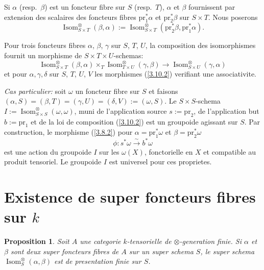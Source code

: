 \documentclass[11pt,a4paper]{article}
\theoremstyle{plain}
\newtheorem{proposition}[theorem]{Proposition}
\theoremstyle{definition}
\newcommand{\pr}{\mathrm{pr}}
\newcommand{\Isom}{\operatorname{Isom}}
\begin{document}
Si $\alpha$ (resp.~$\beta$) est un foncteur fibre sur $S$ (resp.~$T$), $\alpha$ et $\beta$ fournissent par extension des scalaires des foncteurs fibres $\pr_1^*\alpha$ et $\pr_2^*\beta$ sur $S\times T$. Nous poserons
\begin{equation}\label{3.10.1}
\Isom^\otimes_{S\times T}(\beta,\alpha):=\Isom^\otimes_{S\times T}(\pr_2^*\beta,\pr_1^*\alpha).
\end{equation}

Pour trois foncteurs fibres $\alpha$, $\beta$, $\gamma$ sur $S$, $T$, $U$, la composition des isomorphismes fournit un morphisme de $S\times T\times U$-schemas:
\begin{equation}\label{3.10.2}
\Isom^\otimes_{S\times T}(\beta,\alpha)\times_T\Isom^\otimes_{T\times U}(\gamma,\beta)\longrightarrow\Isom^\otimes_{S\times U}(\gamma,\alpha)
\end{equation}
et pour $\alpha,\gamma,\delta$ sur $S$, $T$, $U$, $V$ les morphismes (\ref{3.10.2}) verifiant une associativite.

\emph{Cas particulier:} soit $\omega$ un foncteur fibre sur $S$ et faisons $(\alpha,S)=(\beta,T)=(\gamma,U)=(\delta,V):=(\omega,S)$. Le $S\times S$-schema $I:=\Isom^\otimes_{S\times S}(\omega,\omega)$, muni de l'application source $s:=\pr_2$, de l'application but $b:=\pr_1$ et de la loi de composition (\ref{3.10.2}) est un groupoide agissant sur $S$. Par construction, le morphisme (\ref{3.8.2}) pour $\alpha=\pr_1^*\omega$ et $\beta=\pr_2^*\omega$
\[
\phi:s^*\omega\xrightarrow{\sim}b^*\omega
\]
est une action du groupoide $I$ sur les $\omega(X)$, fonctorielle en $X$ et compatible au produit tensoriel. Le groupoide $I$ est universel pour ces proprietes.

\section{Existence de super foncteurs fibres sur $k$}\label{4}

\begin{proposition}\label{4.1}
Soit $A$ une categorie $k$-tensorielle de $\otimes$-generation finie. Si $\alpha$ et $\beta$ sont deux super foncteurs fibres de $A$ sur un super schema $S$, le super schema $\Isom^\otimes_S(\alpha,\beta)$ est de presentation finie sur $S$.
\end{proposition}
\end{document}
